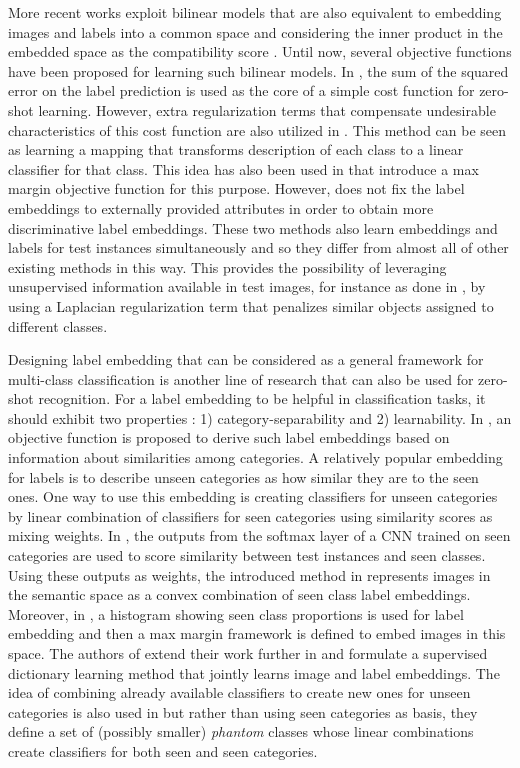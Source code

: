 \documentclass[10pt,twocolumn,letterpaper]{article}
\begin{document}
More recent works exploit bilinear models that are also equivalent to embedding images and labels into a
common space and considering the inner product in the embedded space as the compatibility score \cite{Yu2013, devise, convex, sse, emb15,semi15}.
Until now, several objective functions have been proposed for learning such bilinear models.
In \cite{emb15}, the sum of the squared error on the label prediction is used as the core of a simple cost function for zero-shot learning. However, extra regularization terms that compensate undesirable characteristics of this cost function are also utilized in \cite{emb15}.
This method can be seen as learning a mapping that transforms description of each class to a linear classifier for that class. This idea has also been used in \cite{li15max, semi15} that introduce a max margin objective function for this purpose.
However, \cite{semi15} does not fix the label embeddings to externally provided attributes in order to obtain more discriminative label embeddings. These two methods also learn embeddings and labels for test instances simultaneously and so they differ from almost all of other existing methods in this way. This provides the possibility of
leveraging unsupervised information available in test images, for instance as done in \cite{semi15}, by using a Laplacian regularization term that penalizes similar objects assigned to different classes.

Designing label embedding that can be considered as a general framework for multi-class classification is another line of research that can also be used for zero-shot recognition. For a label embedding to be helpful in classification tasks,
 it should exhibit two properties \cite{Yu2013}: 1) category-separability and 2) learnability. In \cite{Yu2013}, an objective function is proposed to derive such label embeddings based on information about similarities among categories.
A relatively popular embedding for labels is to describe unseen categories as how similar they are to the seen ones.
One way to use this embedding is creating classifiers for unseen categories by linear combination of
classifiers for seen categories using similarity scores as mixing weights.
In \cite{convex}, the outputs from the softmax layer of a CNN trained on seen categories are used to score similarity between test instances and seen classes.
Using these outputs as weights, the introduced method in \cite{convex} represents images in the semantic space as a convex combination of seen class label embeddings.
Moreover, in \cite{sse}, a histogram showing seen class proportions is used for label embedding and then a max margin framework is defined to embed images in this space. The authors of \cite{convex} extend their work further in \cite{agnostic} and formulate a supervised dictionary learning method that jointly learns image and label embeddings.
 The idea of combining already available classifiers to create new ones for unseen categories is also used in \cite{Synthesized}
 but rather than using seen categories as basis, they define a set of (possibly smaller) \textit{phantom} classes whose linear combinations
 create classifiers for both seen and seen categories.
\end{document}
